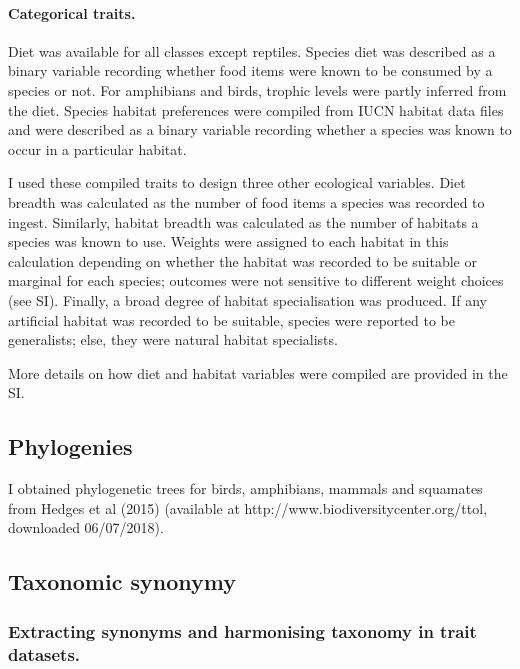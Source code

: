 \paragraph{Categorical traits.}
Diet was available for all classes except reptiles. Species diet was described as a binary variable recording whether food items were known to be consumed by a species or not. %
For amphibians and birds, trophic levels were partly inferred from the diet. 
Species habitat preferences were compiled from IUCN habitat data files and were described as a binary variable recording whether a species was known to occur in a particular habitat. 

I used these compiled traits to design three other ecological variables. Diet breadth was calculated as the number of food items a species was recorded to ingest. Similarly, habitat breadth was calculated as the number of habitats a species was known to use. Weights were assigned to each habitat in this calculation depending on whether the habitat was recorded to be suitable or marginal for each species; outcomes were not sensitive to different weight choices (see SI). Finally, a broad degree of habitat specialisation was produced. If any artificial habitat was recorded to be suitable, species were reported to be generalists; else, they were natural habitat specialists.

More details on how diet and habitat variables were compiled are provided in the SI.

\subsection{Phylogenies}
I obtained phylogenetic trees for birds, amphibians, mammals and squamates from Hedges et al (2015)
(available at http://www.biodiversitycenter.org/ttol, downloaded 06/07/2018).

\subsection{Taxonomic synonymy}

\subsubsection{Extracting synonyms and harmonising taxonomy in trait datasets.}

